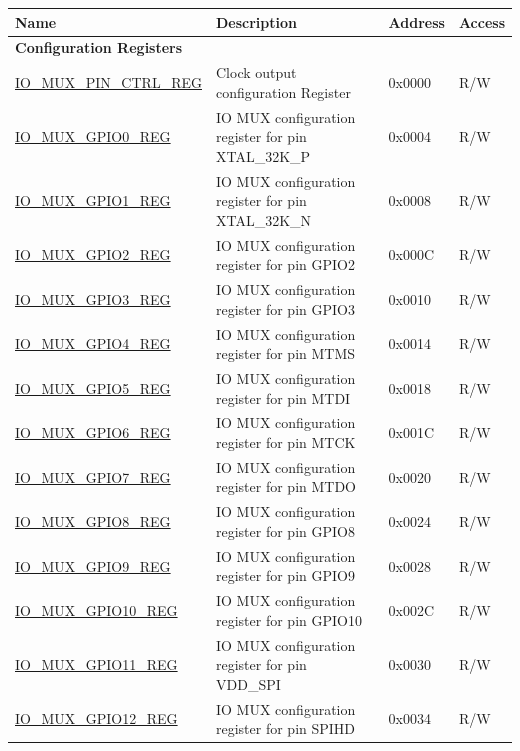 \begin{longtable}{ | p{6cm} | p{7.2cm} | p{1.3cm} | p{1cm} | }
\hline\rowcolor{lightgray}
Name & Description &  Address & Access \\ \hline
\endhead
\multicolumn{4}{|l|}{\textbf{Configuration Registers}} \\ \hline
\hyperref[regdesc:IOMUXPINCTRLREG]{IO\_MUX\_PIN\_CTRL\_REG} & Clock output configuration Register & 0x0000 & R/W \\ \hline
\hyperref[regdesc:IOMUXGPIONREG]{IO\_MUX\_GPIO0\_REG} & IO MUX configuration register for pin XTAL\_32K\_P & 0x0004 & R/W \\ \hline
\hyperref[regdesc:IOMUXGPIONREG]{IO\_MUX\_GPIO1\_REG} & IO MUX configuration register for pin XTAL\_32K\_N & 0x0008 & R/W \\ \hline
\hyperref[regdesc:IOMUXGPIONREG]{IO\_MUX\_GPIO2\_REG} & IO MUX configuration register for pin GPIO2 & 0x000C & R/W \\ \hline
\hyperref[regdesc:IOMUXGPIONREG]{IO\_MUX\_GPIO3\_REG} & IO MUX configuration register for pin GPIO3 & 0x0010 & R/W \\ \hline
\hyperref[regdesc:IOMUXGPIONREG]{IO\_MUX\_GPIO4\_REG} & IO MUX configuration register for pin MTMS& 0x0014 & R/W \\ \hline
\hyperref[regdesc:IOMUXGPIONREG]{IO\_MUX\_GPIO5\_REG} & IO MUX configuration register for pin MTDI & 0x0018 & R/W \\ \hline
\hyperref[regdesc:IOMUXGPIONREG]{IO\_MUX\_GPIO6\_REG} & IO MUX configuration register for pin MTCK & 0x001C & R/W \\ \hline
\hyperref[regdesc:IOMUXGPIONREG]{IO\_MUX\_GPIO7\_REG} & IO MUX configuration register for pin MTDO & 0x0020 & R/W \\ \hline
\hyperref[regdesc:IOMUXGPIONREG]{IO\_MUX\_GPIO8\_REG} & IO MUX configuration register for pin GPIO8 & 0x0024 & R/W \\ \hline
\hyperref[regdesc:IOMUXGPIONREG]{IO\_MUX\_GPIO9\_REG} & IO MUX configuration register for pin GPIO9 & 0x0028 & R/W \\ \hline
\hyperref[regdesc:IOMUXGPIONREG]{IO\_MUX\_GPIO10\_REG} & IO MUX configuration register for pin GPIO10 & 0x002C & R/W \\ \hline
\hyperref[regdesc:IOMUXGPIONREG]{IO\_MUX\_GPIO11\_REG} & IO MUX configuration register for pin VDD\_SPI & 0x0030 & R/W \\ \hline
\hyperref[regdesc:IOMUXGPIONREG]{IO\_MUX\_GPIO12\_REG} & IO MUX configuration register for pin SPIHD & 0x0034 & R/W \\ \hline

\end{longtable}
